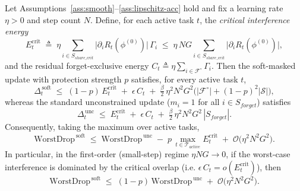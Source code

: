 \begin{theorem}
\label{thm:worstdrop}
Let Assumptions~\ref{ass:smooth}--\ref{ass:lipschitz-acc} hold and fix
a learning rate $\eta>0$ and step count $N$. Define, for each active
task $t$, the \emph{critical interference energy}
\begin{equation}
\label{eq:Ecrit}
E^{\mathrm{crit}}_{t}\;\triangleq\;
\eta\!\!\sum_{i\in S_{share\_crit}}\!\!
\big|\partial_{i}R_{t}(\phi^{(0)})\big|\,\Gamma_{i}
\;\le\; \eta\,NG\!\!\sum_{i\in S_{share\_crit}}\!\!\big|\partial_{i}R_{t}(\phi^{(0)})\big|,
\end{equation}
and the residual forget-exclusive energy
$C_{t}\triangleq\eta\sum_{i\in\mathcal{F}^{\!\circ}}\Gamma_{i}$.
Then the soft-masked update with protection strength $p$ satisfies,
for every active task $t$,
\begin{equation}
\label{eq:soft-bound}
\Delta_{t}^{\,\mathrm{soft}}
\;\le\;
(1-p)\,E^{\mathrm{crit}}_{t}
\;+\;\epsilon\,C_{t}
\;+\;\tfrac{\beta}{2}\,\eta^{2}N^{2}G^{2}
      \Big(|\mathcal{F}^{\!\circ}| + (1-p)^{2}|\mathcal{S}|\Big),
\end{equation}
whereas the standard unconstrained update ($m_{i}=1$ for all
$i\in S_{forget}$) satisfies
\begin{equation}
\label{eq:unc-bound}
\Delta_{t}^{\,\mathrm{unc}}
\;\le\;
E^{\mathrm{crit}}_{t}
\;+\;\epsilon\,C_{t}
\;+\;\tfrac{\beta}{2}\,\eta^{2}N^{2}G^{2}\,|S_{forget}|.
\end{equation}
Consequently, taking the maximum over active tasks,
\begin{equation}
\label{eq:worstdrop-gap}
\mathrm{WorstDrop}^{\,\mathrm{soft}}
\;\le\;
\mathrm{WorstDrop}^{\,\mathrm{unc}}
\;-\;p\,\max_{t\in\mathcal{T}_{active}}E^{\mathrm{crit}}_{t}
\;+\;\mathcal{O}\!\big(\eta^{2}N^{2}G^{2}\big).
\end{equation}
In particular, in the first-order (small-step) regime
$\eta NG\!\to\!0$, if the worst-case interference is dominated by the
critical overlap (i.e. $\epsilon\,C_{t}=o(E^{\mathrm{crit}}_{t})$),
then
\begin{equation}
\label{eq:contraction}
\boxed{\;
\mathrm{WorstDrop}^{\,\mathrm{soft}}
\;\le\;(1-p)\,\mathrm{WorstDrop}^{\,\mathrm{unc}}
\;+\;\mathcal{O}\!\big(\eta^{2}N^{2}G^{2}\big).\;}
\end{equation}
\end{theorem}

